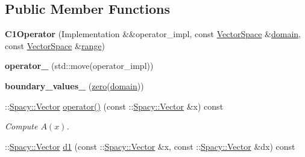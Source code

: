 \subsection*{\-Public \-Member \-Functions}
\begin{DoxyCompactItemize}
\item 
\hypertarget{classSpacy_1_1dealII_1_1C1Operator_a2eae8e3f6aea4551ebba3e639f89ab34}{{\bfseries \-C1\-Operator} (\-Implementation \&\&operator\-\_\-impl, const \hyperlink{classSpacy_1_1VectorSpace}{\-Vector\-Space} \&\hyperlink{classSpacy_1_1OperatorBase_a2588f9b3e0188820c4c494e63293dc6f}{domain}, const \hyperlink{classSpacy_1_1VectorSpace}{\-Vector\-Space} \&\hyperlink{classSpacy_1_1OperatorBase_ab19d3b7a6f290b1079248f1e567e53d6}{range})}\label{classSpacy_1_1dealII_1_1C1Operator_a2eae8e3f6aea4551ebba3e639f89ab34}

\item 
\hypertarget{classSpacy_1_1dealII_1_1C1Operator_a6e698e6741c399f302cd0f7f3d01a39f}{{\bfseries operator\-\_\-} (std\-::move(operator\-\_\-impl))}\label{classSpacy_1_1dealII_1_1C1Operator_a6e698e6741c399f302cd0f7f3d01a39f}

\item 
\hypertarget{classSpacy_1_1dealII_1_1C1Operator_a5b74dd02741ea69a7f4536d78be7473e}{{\bfseries boundary\-\_\-values\-\_\-} (\hyperlink{namespaceSpacy_ac7f0661bfdb52144b9ff0b9bbdd81f69}{zero}(\hyperlink{classSpacy_1_1OperatorBase_a2588f9b3e0188820c4c494e63293dc6f}{domain}))}\label{classSpacy_1_1dealII_1_1C1Operator_a5b74dd02741ea69a7f4536d78be7473e}

\item 
\hypertarget{classSpacy_1_1dealII_1_1C1Operator_afb5df65e8e89f6ac159bbb859ad9799c}{\-::\hyperlink{classSpacy_1_1Vector}{\-Spacy\-::\-Vector} \hyperlink{classSpacy_1_1dealII_1_1C1Operator_afb5df65e8e89f6ac159bbb859ad9799c}{operator()} (const \-::\hyperlink{classSpacy_1_1Vector}{\-Spacy\-::\-Vector} \&x) const }\label{classSpacy_1_1dealII_1_1C1Operator_afb5df65e8e89f6ac159bbb859ad9799c}

\begin{DoxyCompactList}\small\item\em \-Compute $A(x)$. \end{DoxyCompactList}\item 
\hypertarget{classSpacy_1_1dealII_1_1C1Operator_a766d636022666719cb92dd3b272e9fb7}{\-::\hyperlink{classSpacy_1_1Vector}{\-Spacy\-::\-Vector} \hyperlink{classSpacy_1_1dealII_1_1C1Operator_a766d636022666719cb92dd3b272e9fb7}{d1} (const \-::\hyperlink{classSpacy_1_1Vector}{\-Spacy\-::\-Vector} \&x, const \-::\hyperlink{classSpacy_1_1Vector}{\-Spacy\-::\-Vector} \&dx) const }\label{classSpacy_1_1dealII_1_1C1Operator_a766d636022666719cb92dd3b272e9fb7}


\end{DoxyCompactItemize}

